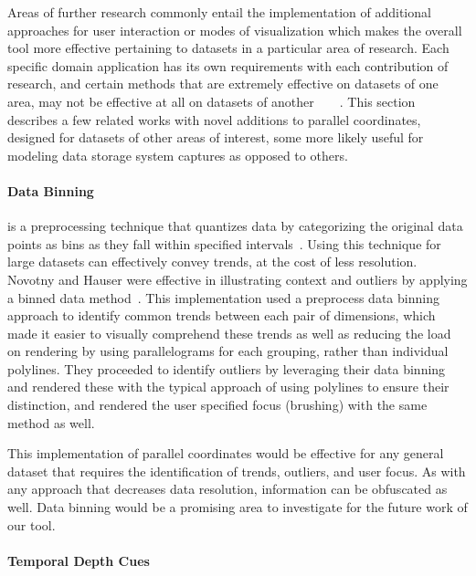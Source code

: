 \documentclass[journal]{vgtc}                %
\begin{document}
Areas of further research commonly entail the implementation of additional approaches for user interaction or modes of visualization which makes the overall tool more effective pertaining to datasets in a particular area of research. Each specific domain application has its own requirements with each contribution of research, and certain methods that are extremely effective on datasets of one area, may not be effective at all on datasets of another~\cite{Graham:2003:UCE}~\cite{johansson:2007:DCDTPC}~\cite{novotny:2006:OPFC}~\cite{peng:2005:CRMD}. This section describes a few related works with novel additions to parallel coordinates, designed for datasets of other areas of interest, some more likely useful for modeling data storage system captures as opposed to others.

\paragraph{Data Binning}
\label{data_binning}
is a preprocessing technique that quantizes data by categorizing the original data points as bins as they fall within specified intervals~\cite{website:binning}. Using this technique for large datasets can effectively convey trends, at the cost of less resolution. Novotny and Hauser were effective in illustrating context and outliers by applying a binned data method~\cite{novotny:2006:OPFC}. This implementation used a preprocess data binning approach to identify common trends between each pair of dimensions, which made it easier to visually comprehend these trends as well as reducing the load on rendering by using parallelograms for each grouping, rather than individual polylines. They proceeded to identify outliers by leveraging their data binning and rendered these with the typical approach of using polylines to ensure their distinction, and rendered the user specified focus (brushing) with the same method as well.

This implementation of parallel coordinates would be effective for any general dataset that requires the identification of trends, outliers, and user focus. As with any approach that decreases data resolution, information can be obfuscated as well. Data binning would be a promising area to investigate for the future work of our tool.

\paragraph{Temporal Depth Cues}
\label{temporal_depth_cues}
\end{document}
